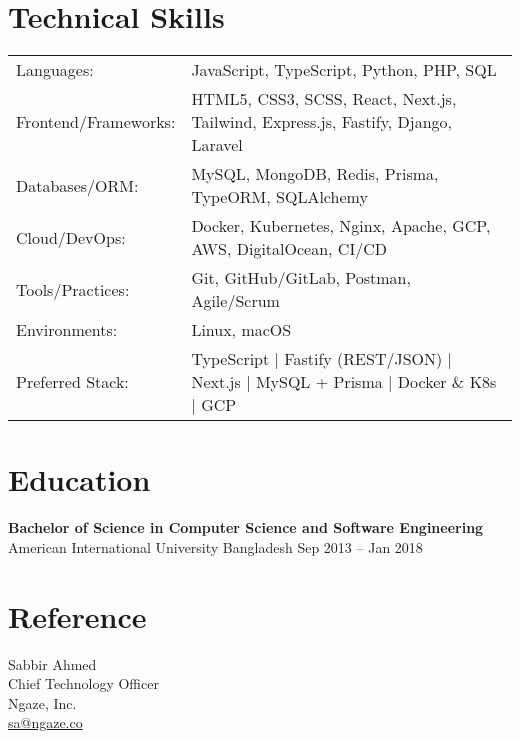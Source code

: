 \documentclass[a4paper,10pt]{article}
\begin{document}
\section*{Technical Skills}
\begin{tabular}{@{}ll}
Languages: & JavaScript, TypeScript, Python, PHP, SQL \\
Frontend/Frameworks: & HTML5, CSS3, SCSS, React, Next.js, Tailwind, Express.js, Fastify, Django, Laravel \\
Databases/ORM: & MySQL, MongoDB, Redis, Prisma, TypeORM, SQLAlchemy \\
Cloud/DevOps: & Docker, Kubernetes, Nginx, Apache, GCP, AWS, DigitalOcean, CI/CD \\
Tools/Practices: & Git, GitHub/GitLab, Postman, Agile/Scrum \\
Environments: & Linux, macOS \\
Preferred Stack: & TypeScript | Fastify (REST/JSON) | Next.js | MySQL + Prisma | Docker \& K8s | GCP \\
\end{tabular}

\section*{Education}
\textbf{Bachelor of Science in Computer Science and Software Engineering}\\
American International University Bangladesh \hfill Sep 2013 -- Jan 2018

\vspace{2pt}

\section*{Reference}
Sabbir Ahmed \\
Chief Technology Officer \\
Ngaze, Inc. \\
\href{mailto:sa@ngaze.co}{sa@ngaze.co}
\end{document}
